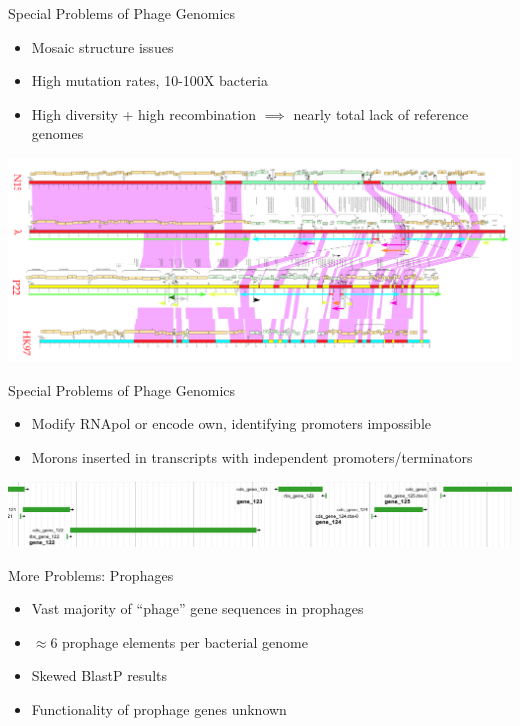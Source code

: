 \documentclass[12pt]{beamer}
\begin{document}
\begin{frame}{Special Problems of Phage Genomics}
    \begin{itemize}
        \item Mosaic structure issues
        \item High mutation rates, 10-100X bacteria
        \item High diversity + high recombination $\implies$ nearly total lack of reference genomes
    \end{itemize}
    \includegraphics[width=\textwidth]{./ALOID.png}
\end{frame}

\begin{frame}{Special Problems of Phage Genomics}
    \begin{itemize}
        \item Modify RNApol or encode own, identifying promoters impossible
        \item Morons inserted in transcripts with independent promoters/terminators
    \end{itemize}
    \centering
    \includegraphics[width=\textwidth]{./morons.png}
\end{frame}

\begin{frame}{More Problems: Prophages}
    \begin{itemize}
        \item Vast majority of ``phage'' gene sequences in prophages
        \item $\approx$6 prophage elements per bacterial genome
        \item Skewed BlastP results
        \item Functionality of prophage genes unknown
    \end{itemize}
\end{frame}
\end{document}
